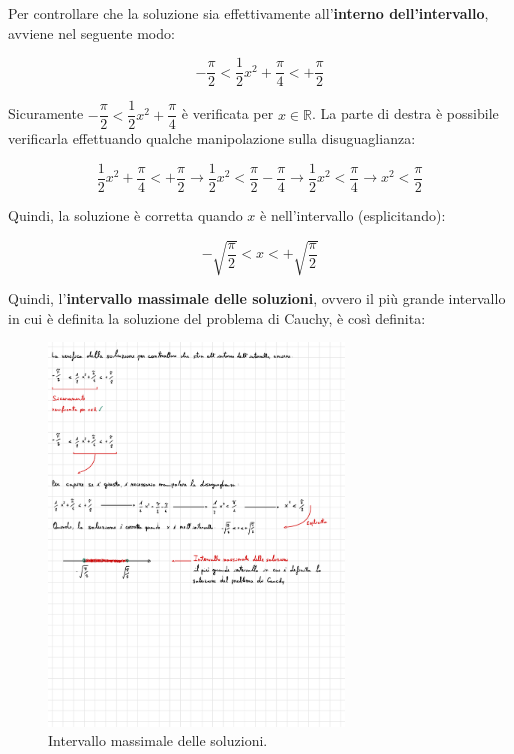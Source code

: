 \documentclass[a4paper]{article}
\begin{document}
	\noindent
	Per controllare che la soluzione sia effettivamente all'\textbf{interno dell'intervallo}, avviene nel seguente modo:
	
	\begin{equation*}
		-\dfrac{\pi}{2} < \dfrac{1}{2} x^2 + \dfrac{\pi}{4} < + \dfrac{\pi}{2}
	\end{equation*}

	\noindent
	Sicuramente $-\dfrac{\pi}{2} < \dfrac{1}{2} x^2 + \dfrac{\pi}{4}$ è verificata per $x \in \mathbb{R}$. La parte di destra è possibile verificarla effettuando qualche manipolazione sulla disuguaglianza:
	
	\begin{equation*}
		\dfrac{1}{2} x^2 + \dfrac{\pi}{4} < + \dfrac{\pi}{2} \longrightarrow \dfrac{1}{2} x^2 < \dfrac{\pi}{2} - \dfrac{\pi}{4} \longrightarrow \dfrac{1}{2} x^2 < \dfrac{\pi}{4} \longrightarrow x^2 < \dfrac{\pi}{2}
	\end{equation*}

	\noindent
	Quindi, la soluzione è corretta quando $x$ è nell'intervallo (esplicitando):
	
	\begin{equation*}
		- \sqrt{\dfrac{\pi}{2}} < x < + \sqrt{\dfrac{\pi}{2}}
	\end{equation*}

	\newpage

	\noindent
	Quindi, l'\textcolor{Red3}{\textbf{intervallo massimale delle soluzioni}}, ovvero il più grande intervallo in cui è definita la soluzione del problema di Cauchy, è così definita:
	
	\begin{figure}[!htp]
		\centering
		\includegraphics[width=0.7\textwidth]{img/intervallo_max_eg.pdf}
		\caption{Intervallo massimale delle soluzioni.}
	\end{figure}
\end{document}
